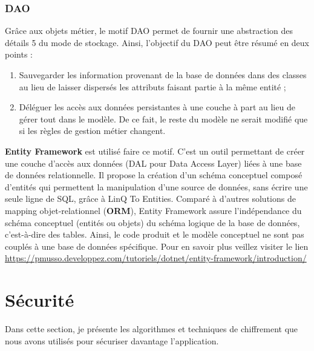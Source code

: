 \subsubsection{DAO}
\label{DAO}
Grâce aux objets métier, le motif \gls{DAO} permet de fournir une abstraction des détails 5 du mode
de stockage. Ainsi, l’objectif du DAO peut être résumé en deux points :
\begin{enumerate}
	\item Sauvegarder les information provenant de la base de données dans des classes au lieu de laisser
	dispersés les attributs faisant partie à la même entité ;
	\item Déléguer les accès aux données persistantes à une couche à part au lieu de gérer tout dans
	le modèle. De ce fait, le reste du modèle ne serait modifié que si les règles de gestion métier
	changent.
\end{enumerate}
\textbf{Entity Framework} est utilisé faire ce motif. C'est un outil permettant de créer une couche d'accès aux données (DAL pour Data Access Layer) liées à une base de données relationnelle. Il propose la création d'un schéma conceptuel composé d'entités qui permettent la manipulation d'une source de données, sans écrire une seule ligne de SQL, grâce à LinQ To Entities. Comparé à d'autres solutions de mapping objet-relationnel (\textbf{ORM}), Entity Framework assure l'indépendance du schéma conceptuel (entités ou objets) du schéma logique de la base de données, c'est-à-dire des tables. Ainsi, le code produit et le modèle conceptuel ne sont pas couplés à une base de données spécifique. Pour en savoir plus veillez visiter le lien \href{https://pmusso.developpez.com/tutoriels/dotnet/entity-framework/introduction/}{https://pmusso.developpez.com/tutoriels/dotnet/entity-framework/introduction/}

\section{Sécurité}
Dans cette section, je présente les algorithmes et techniques de chiffrement que nous avons
utilisés pour sécuriser davantage l'application.

